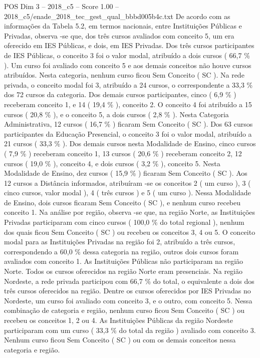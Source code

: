 \begin{textsample}{POS Dim 3 – 2018\_c5 – Score 1.00 – 2018\_c5/enade\_2018\_tec\_gest\_qual\_bbbd005b4c.txt}
De acordo com as informações da Tabela 5.2, em termos nacionais, entre Instituições Públicas e Privadas, observa -se que, dos três cursos avaliados com conceito 5, um era oferecido em IES Públicas, e dois, em IES Privadas.
Dos três cursos participantes de IES Públicas, o conceito 3 foi o valor modal, atribuído a dois cursos ( 66,7 \% ).
Um curso foi avaliado com conceito 5 e aos demais conceitos não houve cursos atribuídos.
Nesta categoria, nenhum curso ficou Sem Conceito ( SC ).
Na rede privada, o conceito modal foi 3, atribuído a 24 cursos, o correspondente a 33,3 \% dos 72 cursos da categoria.
Dos demais cursos participantes, cinco ( 6,9 \% ) receberam conceito 1, e 14 ( 19,4 \% ), conceito 2.
O conceito 4 foi atribuído a 15 cursos ( 20,8 \% ), e o conceito 5, a dois cursos ( 2,8 \% ).
Nesta Categoria Administrativa, 12 cursos ( 16,7 \% ) ficaram Sem Conceito ( SC ).
Dos 63 cursos participantes da Educação Presencial, o conceito 3 foi o valor modal, atribuído a 21 cursos ( 33,3 \% ).
Dos demais cursos nesta Modalidade de Ensino, cinco cursos ( 7,9 \% ) receberam conceito 1, 13 cursos ( 20,6 \% ) receberam conceito 2, 12 cursos ( 19,0 \% ), conceito 4, e dois cursos ( 3,2 \% ), conceito 5.
Nesta Modalidade de Ensino, dez cursos ( 15,9 \% ) ficaram Sem Conceito ( SC ).
Aos 12 cursos a Distância informados, atribuíram -se os conceitos 2 ( um curso ), 3 ( cinco cursos, valor modal ), 4 ( três cursos ) e 5 ( um curso ).
Nessa Modalidade de Ensino, dois cursos ficaram Sem Conceito ( SC ), e nenhum curso recebeu conceito 1.
Na análise por região, observa -se que, na região Norte, as Instituições Privadas participaram com cinco cursos ( 100,0 \% do total regional ), nenhum dos quais ficou Sem Conceito ( SC ) ou recebeu os conceitos 3, 4 ou 5.
O conceito modal para as Instituições Privadas na região foi 2, atribuído a três cursos, correspondendo a 60,0 \% dessa categoria na região, outros dois cursos foram avaliados com conceito 1.
As Instituições Públicas não participaram na região Norte.
Todos os cursos oferecidos na região Norte eram presenciais.
Na região Nordeste, a rede privada participou com 66,7 \% do total, o equivalente a dois dos três cursos oferecidos na região.
Dentre os cursos oferecidos por IES Privadas no Nordeste, um curso foi avaliado com conceito 3, e o outro, com conceito 5.
Nessa combinação de categoria e região, nenhum curso ficou Sem Conceito ( SC ) ou recebeu os conceitos 1, 2 ou 4.
As Instituições Públicas da região Nordeste participaram com um curso ( 33,3 \% do total da região ) avaliado com conceito 3.
Nenhum curso ficou Sem Conceito ( SC ) ou com os demais conceitos nessa categoria e região.

\end{textsample}
